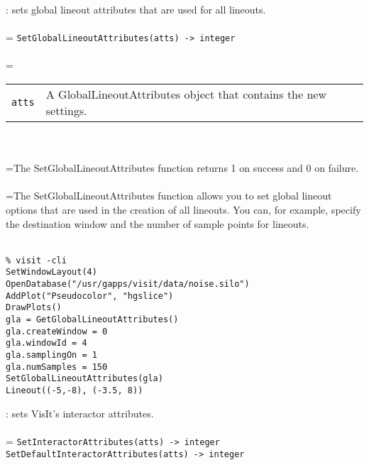 \documentclass[10pt,a4paper]{report}
\begin{document}
{}
: sets global lineout attributes that are used for all lineouts.\\[-3mm]

 \\ 
\hangindent=\parindent 
\verb!SetGlobalLineoutAttributes(atts) -> integer!\\ [-3mm]

 \\ 
\hangindent=\parindent 
\begin{tabular}{lp{9cm}}
\verb!atts! & A GlobalLineoutAttributes object that contains the new settings. \\
\end{tabular} \\[-2mm]


 \\ 
\hangindent=\parindent The SetGlobalLineoutAttributes function returns 1 on success and 0 on failure. \\[-3mm] 

 \\ 
\hangindent=\parindent The SetGlobalLineoutAttributes function allows you to set global lineout options that are used in the creation of all lineouts. You can, for example, specify the destination window and the number of sample points for lineouts. \\[-3mm] 

\\[-6mm]
\begin{verbatim}% visit -cli
SetWindowLayout(4)
OpenDatabase("/usr/gapps/visit/data/noise.silo")
AddPlot("Pseudocolor", "hgslice")
DrawPlots()
gla = GetGlobalLineoutAttributes()
gla.createWindow = 0
gla.windowId = 4
gla.samplingOn = 1
gla.numSamples = 150
SetGlobalLineoutAttributes(gla)
Lineout((-5,-8), (-3.5, 8))
\end{verbatim}
\newpage


{}
: sets VisIt's interactor attributes.\\[-3mm]

 \\ 
\hangindent=\parindent 
\verb!SetInteractorAttributes(atts) -> integer!\\ 
\verb!SetDefaultInteractorAttributes(atts) -> integer!\\ [-3mm]
\end{document}
